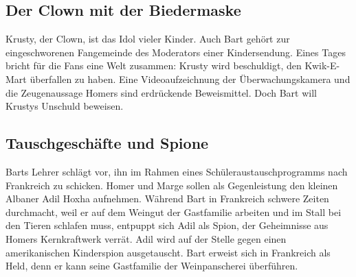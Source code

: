 \subsection{Der Clown mit der Biedermaske}\label{7G12}
Krusty, der Clown, ist das Idol vieler Kinder. Auch Bart gehört zur eingeschworenen Fangemeinde des Moderators einer Kindersendung. Eines Tages bricht für die Fans eine Welt zusammen: Krusty wird beschuldigt, den Kwik-E-Mart überfallen zu haben. Eine Videoaufzeichnung der Überwachungskamera und die Zeugenaussage Homers sind erdrückende Beweismittel. Doch Bart will Krustys Unschuld beweisen.

	
\subsection{Tauschgeschäfte und Spione}\label{7G13}
Barts Lehrer schlägt vor, ihn im Rahmen eines Schüleraustauschprogramms nach Frankreich zu schicken. Homer und Marge sollen als Gegenleistung den kleinen Albaner Adil Hoxha aufnehmen. Während Bart in Frankreich schwere Zeiten durchmacht, weil er auf dem Weingut der Gastfamilie arbeiten und im Stall bei den Tieren schlafen muss, entpuppt sich Adil als Spion, der Geheimnisse aus Homers Kernkraftwerk verrät. Adil wird auf der Stelle gegen einen amerikanischen Kinderspion ausgetauscht. Bart erweist sich in Frankreich als Held, denn er kann seine Gastfamilie der Weinpanscherei überführen.

